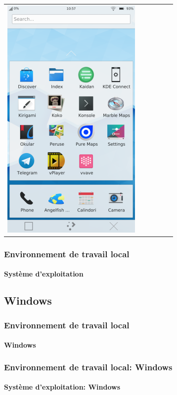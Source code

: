 \documentclass{beamer}
\begin{document}
\begin{frame}
\begin{center}
\begin{tabular}{llllll}
	\includegraphics[height=.4\textheight]{..//img/Bweb01-environnement/plasmaphone.png} \\
\end{tabular}
\end{center}

\end{frame}

\begin{frame}
\frametitle{Environnement de travail local}
\framesubtitle{Système d'exploitation}



\end{frame}

\subsection{Windows}

\begin{frame}
\frametitle{Environnement de travail local}
\framesubtitle{Windows}

\end{frame}

\begin{frame}
\frametitle{Environnement de travail local: Windows}
\framesubtitle{Système d'exploitation: Windows}

\end{frame}
\end{document}
